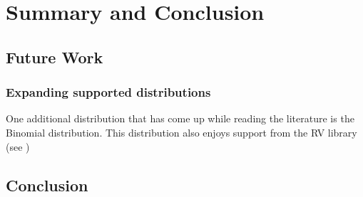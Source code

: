 \chapter{Summary and Conclusion\label{chap:conclusion}}
\section{Future Work}
\subsection{Expanding supported distributions}
One additional distribution that has come up while reading the literature is the Binomial distribution\cite{Dwork2006calibrating}. This distribution also enjoys support from the RV library (see )

\section{Conclusion}
